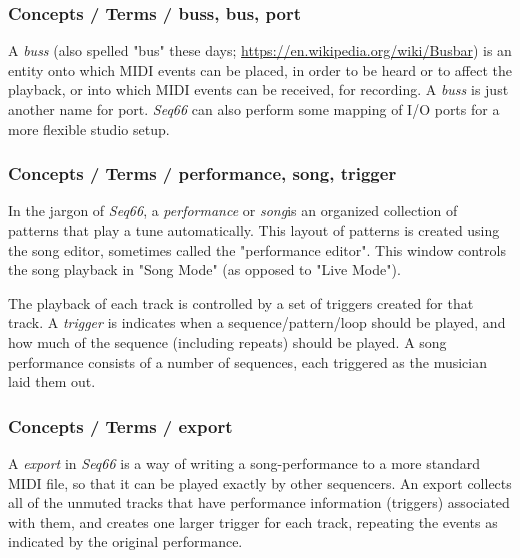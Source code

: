 \subsubsection{Concepts / Terms / buss, bus, port}
\label{subsubsec:concepts_terms_buss}

   A \textsl{buss} (also spelled "bus" these days;
   \url{https://en.wikipedia.org/wiki/Busbar}) is an entity onto which
   MIDI events can be placed, in order to be heard or to affect the
   playback, or into which MIDI events can be received, for recording.
   A \textsl{buss} is just another name for port.
   \textsl{Seq66} can also perform some mapping of I/O ports
   for a more flexible studio setup.

\subsubsection{Concepts / Terms / performance, song, trigger}
\label{subsubsec:concepts_terms_performance}

   In the jargon of \textsl{Seq66}, a
   \textsl{performance} or
   \textsl{song}is an organized collection of patterns that play a tune
   automatically.
   This layout of patterns is created using the song editor, sometimes
   called the "performance editor".
   This window controls the song playback in "Song Mode"
   (as opposed to "Live Mode").

   The playback of each track is controlled by a set of triggers created for
   that track.
   A \textsl{trigger} is indicates when a sequence/pattern/loop
   should be played, and how much of the sequence (including repeats) should be
   played.  A song performance consists of a number of sequences, each
   triggered as the musician laid them out.

\subsubsection{Concepts / Terms / export}
\label{subsubsec:concepts_terms_export}

   A \textsl{export} in \textsl{Seq66} is a way of writing a
   song-performance to a more standard MIDI file, so that it can be played
   exactly by other sequencers.
   An export collects all of the unmuted tracks that have
   performance information (triggers) associated with them, and creates one
   larger trigger for each track, repeating the events as indicated by the
   original performance.

